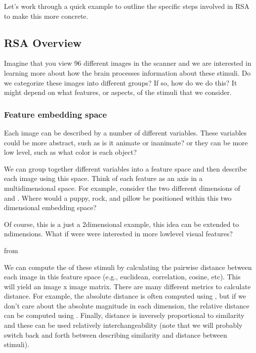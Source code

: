 \documentclass[letterpaper,10pt,english]{sphinxmanual}
\begin{document}
Let’s work through a quick example to outline the specific steps involved in RSA to make this more concrete.


\subsection{RSA Overview}
\label{\detokenize{content/RSA:rsa-overview}}
Imagine that you view 96 different images in the scanner and we are interested in learning more about how the brain processes information about these stimuli. Do we categorize these images into different groups? If so, how do we do this? It might depend on what features, or aspects, of the stimuli that we consider.


\subsubsection{Feature embedding space}
\label{\detokenize{content/RSA:feature-embedding-space}}
Each image can be described by a number of different variables. These variables could be more abstract, such as is it animate or inanimate? or they can be more low level, such as what color is each object?

We can group together different variables into a feature space and then describe each image using this space. Think of each feature as an axis in a multidimensional space. For example, consider the two different dimensions of  and . Where would a puppy, rock, and pillow be positioned within this two dimensional embedding space?


Of course, this is a just a 2\sphinxhyphen{}dimensional example, this idea can be extended to n\sphinxhyphen{}dimensions. What if were were interested in more low\sphinxhyphen{}level visual features?

from 

We can compute the  of these stimuli by calculating the pairwise distance between each image in this feature space (e.g., euclidean, correlation, cosine, etc). This will yield an image x image matrix. There are many different metrics to calculate distance. For example, the absolute distance is often computed using , but if we don’t care about the absolute magnitude in each dimension, the relative distance can be computed using . Finally, distance is inversely proportional to similarity and these can be used relatively interchangeability (note that we will probably switch back and forth between describing similarity and distance between stimuli).
\end{document}
